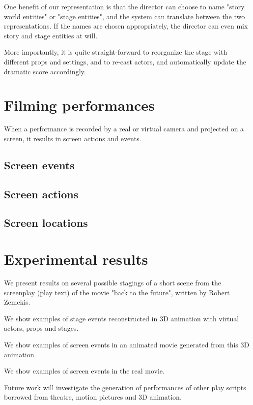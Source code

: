 \documentclass[a4paper,UKenglish]{oasics}
\begin{document}
One benefit of our representation is that the director can choose to name "story world entities" or "stage entities",
and the system can translate between the two representations. If the names are chosen appropriately, the director
can even mix story and stage entities at will.

More importantly, it is quite straight-forward to reorganize the stage with different props and settings, 
and to re-cast actors, and automatically update the dramatic score accordingly.

\section{Filming performances}
When a performance is recorded by a real or virtual camera and projected on a screen,
it results in screen actions and events.

\subsection{Screen events}

\subsection{Screen actions}

\subsection{Screen locations}



\section{Experimental results}

We present results on several possible stagings of a short scene 
from the screenplay (play text) of the movie "back to the future",
written by Robert Zemekis.

We show examples of stage events reconstructed in 3D animation
with virtual  actors, props and stages. 


We show examples of screen events in an animated  movie generated 
from this 3D animation. 

We show examples of screen events in the real movie.

Future work will investigate the generation of performances of other play scripts
borrowed from theatre, motion pictures and 3D animation.
\end{document}
